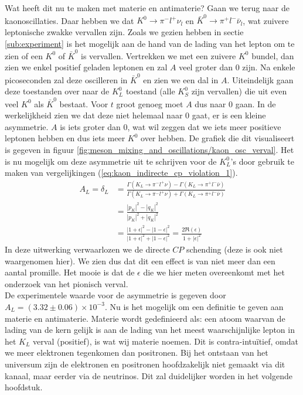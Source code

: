 \documentclass[../main.tex]{subfiles}
\begin{document}
Wat heeft dit nu te maken met materie en antimaterie? Gaan we terug naar de kaonoscillaties. Daar hebben we dat $K^{0} \rightarrow \pi^{-} l^{+} \nu_{l}$ en $\bar{K}^{0} \rightarrow \pi^{+} l^{-} \bar{\nu}_{l}$, wat zuivere leptonische zwakke vervallen zijn. Zoals we gezien hebben in sectie \ref{sub:experiment} is het mogelijk aan de hand van de lading van het lepton om te zien of een $K^0$ of $\bar{K}^0$ is vervallen. Vertrekken we met een zuivere $K^0$ bundel, dan zien we enkel positief geladen leptonen en zal $A$ veel groter dan 0 zijn. Na enkele picoseconden zal deze oscilleren in $\bar{K}^0$ en zien we een dal in $A$. Uiteindelijk gaan deze toestanden over naar de $K_L^0$ toestand (alle $K_S^0$ zijn vervallen) die uit even veel $K^0$ als $\bar{K}^0$ bestaat. Voor $t$ groot genoeg moet $A$ dus naar 0 gaan. In de werkelijkheid zien we dat deze niet helemaal naar 0 gaat, er is een kleine asymmetrie. $A$ is iets groter dan 0, wat wil zeggen dat we iets meer positieve leptonen hebben en dus iets meer $K^0$ over hebben. De grafiek die dit visualiseert is gegeven in figuur \ref{fig:meson_mixing_and_oscillations/kaon_osc_verval}. Het is nu mogelijk om deze asymmetrie uit te schrijven voor de $K_L^0$'s door gebruik te maken van vergelijkingen (\ref{eq:kaon_indirecte_cp_violation_1}).
\begin{equation}
    \begin{aligned}
        \label{eq:asymmetrie_a_l}
        A_{L}=\delta_{L} &=\frac{\Gamma\left(K_{L} \rightarrow \pi^{-} l^{+} \nu\right)-\Gamma\left(K_{L} \rightarrow \pi^{+} l^{-} \bar{\nu}\right)}{\Gamma\left(K_{L} \rightarrow \pi^{-} l^{+} \nu\right)+\Gamma\left(K_{L} \rightarrow \pi^{+} l^{-} \bar{\nu}\right)} \\
                         &=\frac{\left|p_{K}\right|^{2}-\left|q_{K}\right|^{2}}{\left|p_{K}\right|^{2}+\left|q_{K}\right|^{2}} \\
                         &=\frac{|1+\epsilon|^{2}-|1-\epsilon|^{2}}{|1+\epsilon|^{2}+|1-\epsilon|^{2}}=\frac{2 \Re(\epsilon)}{1+|\epsilon|^{2}}
    \end{aligned}
\end{equation}
In deze uitwerking verwaarlozen we de directe $CP$ schending (deze is ook niet waargenomen hier). We zien dus dat dit een effect is van niet meer dan een aantal promille. Het mooie is dat de $\epsilon$ die we hier meten overeenkomt met het onderzoek van het pionisch verval.\\
De experimentele waarde voor de asymmetrie is gegeven door $A_{L}=(3.32 \pm 0.06) \times 10^{-3}$. Nu is het mogelijk om een definitie te geven aan materie en antimaterie. Materie wordt gedefinieerd als: een atoom waarvan de lading van de kern gelijk is aan de lading van het meest waarschijnlijke lepton in het $K_L$ verval (positief), is wat wij materie noemen. Dit is contra-intuïtief, omdat we meer elektronen tegenkomen dan positronen. Bij het ontstaan van het universum zijn de elektronen en positronen hoofdzakelijk niet gemaakt via dit kanaal, maar eerder via de neutrinos. Dit zal duidelijker worden in het volgende hoofdstuk.
\end{document}
